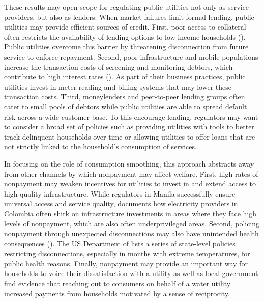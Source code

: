 \documentclass[12pt,table]{article}
\begin{document}
These results may open scope for regulating public utilities not only as service providers, but also as lenders.  When market failures limit formal lending, public utilities may provide efficient sources of credit.  First, poor access to collateral often restricts the availability of lending options to low-income households (\cite{jack2016borrowing}).  Public utilities overcome this barrier by threatening disconnection from future service to enforce repayment.  Second, poor infrastructure and mobile populations increase the transaction costs of screening and monitoring debtors, which contribute to high interest rates (\cite{jack2014risk}).  As part of their business practices, public utilities invest in meter reading and billing systems that may lower these transaction costs.  Third, moneylenders and peer-to-peer lending groups often cater to small pools of debtors while public utilities are able to spread default risk across a wide customer base.  To this encourage lending, regulators may want to consider a broad set of policies such as providing utilities with tools to better track delinquent households over time or allowing utilities to offer loans that are not strictly linked to the household's consumption of services.  

In focusing on the role of consumption smoothing, this approach abstracts away from other channels by which nonpayment may affect welfare.  First, high rates of nonpayment may weaken incentives for utilities to invest in and extend access to high quality infrastructure.  While regulators in Manila successfully ensure universal access and service quality, \cite{mcrae2015infrastructure} documents how electricity providers in Colombia often shirk on infrastructure investments in areas where they face high levels of nonpayment, which are also often underprivileged areas.  Second, policing nonpayment through unexpected disconnections may also have unintended health consequences (\cite{franklin2017}).  The US Department of \cite{liheap} lists a series of state-level policies restricting disconnections, especially in months with extreme temperatures, for public health reasons.  Finally, nonpayment may provide an important way for households to voice their dissatisfaction with a utility as well as local government.  \cite{szabo2015reducing} find evidence that reaching out to consumers on behalf of a water utility increased payments from households motivated by a sense of reciprocity.  

\end{document}
